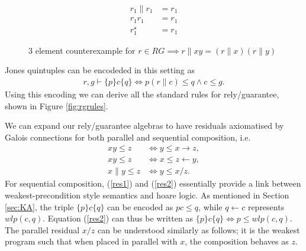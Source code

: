 \documentclass{llncs}
\begin{document}
\begin{figure}
\centering
\begin{subfigure}{0.24\textwidth}
\end{subfigure}
\begin{subfigure}{0.24\textwidth}
\begin{align*}
r_1 \| r_1 &= r_1\\
r_1 r_1 &= r_1\\
r_1^\star &= r_1
\end{align*}
\end{subfigure}
\caption{3 element counterexample for $r \in RG \implies r\|xy = (r\|x)(r\|y)$}
\label{fig:rg3}
\end{figure}

Jones quintuples can be encodeded in this setting as
\begin{align}
r, g \vdash \{p\} c \{q\} \iff p(r\|c) \le q \land c \le g.
\end{align}
Using this encoding we can derive all the standard rules for
rely/guarantee, shown in Figure \ref{fig:rgrules}.

We can expand our rely/guarantee algebras to have residuals
axiomatised by Galois connections for both parallel and sequential
composition, i.e.
\begin{align}
xy \le z &\iff y \le x \rightarrow z, \label{res1}\\
xy \le z &\iff x \le z \leftarrow y, \label{res2}\\
x\|y \le z &\iff y \le x/z \label{res3}.
\end{align}
For sequential composition, (\ref{res1}) and (\ref{res2}) essentially
provide a link between weakest-precondition style semantics and hoare
logic. As mentioned in Section \ref{sec:KA}, the triple $\{p\} c
\{q\}$ can be encoded as $pc \le q$, while $q \leftarrow c$ represents
$wlp(c,q)$. Equation (\ref{res2}) can thus be written as $\{p\} c
\{q\} \iff p \le wlp(c,q)$. The parallel residual $x/z$ can be
understood similarly as follows; it is the weakest program such that
when placed in parallel with $x$, the composition behaves as $z$.
\end{document}
